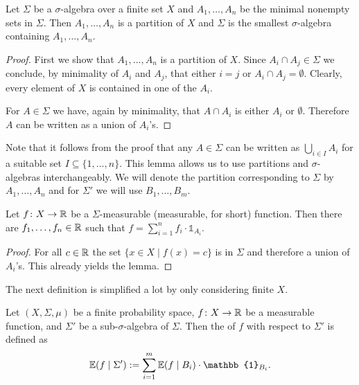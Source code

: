 \begin{lemma}
	Let $\Sigma$ be a $\sigma$-algebra over a finite set $X$ and $A_1,\dots,A_n$ be the minimal nonempty sets in $\Sigma$. Then $A_1,\dots,A_n$ is a partition of $X$ and $\Sigma$ is the smallest $\sigma$-algebra containing $A_1,\dots,A_n$.
\end{lemma}
\begin{proof}
	First we show that $A_1,\dots,A_n$ is a  partition of $X$. Since $A_i\cap A_j\in\Sigma$ we conclude, by minimality of $A_i$ and $A_j$, that either $i=j$ or $A_i\cap A_j=\emptyset$. Clearly, every element of $X$ is contained in one of the $A_i$. 
				
	For $A\in\Sigma$ we have, again by minimality, that $A\cap A_i$ is either $A_i$ or $\emptyset$. Therefore $A$ can be written as a union of $A_i$'s.
\end{proof}
Note that it follows from the proof that any $A\in\Sigma$ can be written as $\bigcup_{i\in I}A_i$ for a suitable set $I\subseteq\{1,\dots,n\}$. This lemma allows us to use partitions and $\sigma$-algebras interchangeably. We will denote the partition corresponding to $\Sigma$ by $A_1,\dots,A_n$ and for $\Sigma'$ we will use $B_1,\dots,B_{m}$.
\begin{lemma}\label{lem:measurabilityForm}
	Let $f\colon X\to\mathbb{R}$ be a $\Sigma$-measurable (measurable, for short) function. Then there are $f_1,\dots,f_n\in\mathbb{R}$ such that $f=\sum_{i=1}^{n}f_i\cdot\mathbb{1}_{A_i}$.
\end{lemma}
\begin{proof}
	For all $c\in\mathbb{R}$ the set $\{x\in X\mid f(x)=c\}$ is in $\Sigma$ and therefore a union of $A_i$'s. This already yields the lemma.
\end{proof}
		
The next definition is simplified a lot by only considering finite $X$.
		
\begin{definition}
	Let $(X,\Sigma,\mu)$ be a finite probability space, $f\colon X\to \mathbb{R}$ be a measurable function, and $\Sigma'$ be a sub-$\sigma$-algebra of $\Sigma$. Then the  of $f$ with respect to $\Sigma'$ is defined as
	\[\E(f\mid \Sigma'):=\sum_{i=1}^{m}\E(f\mid B_i)\cdot \mathbb{1}_{B_i}.\]
\end{definition}
		
